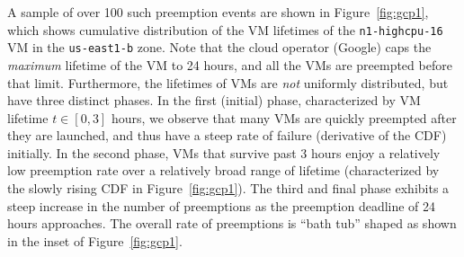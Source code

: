 A sample of over 100 such preemption events are shown in Figure~\ref{fig:gcp1}, which shows cumulative distribution of the VM lifetimes of the \texttt{n1-highcpu-16} VM in the \texttt{us-east1-b} zone. 
Note that the cloud operator (Google) caps the \emph{maximum} lifetime of the VM to 24 hours, and all the VMs are preempted before that limit. 
Furthermore, the lifetimes of VMs are \emph{not} uniformly distributed, but have three distinct phases. 
In the first (initial) phase, characterized by VM lifetime $t\in [0, 3]$ hours, we observe that many VMs are quickly preempted after they are launched, and thus have a steep rate of failure (derivative of the CDF) initially.
In the second phase, VMs that survive past 3 hours enjoy a relatively low preemption rate over a relatively broad range of lifetime (characterized by the slowly rising CDF in Figure~\ref{fig:gcp1}). The third and final phase exhibits a steep increase in the number of preemptions as the preemption deadline of 24 hours approaches. The overall rate of preemptions is ``bath tub'' shaped as shown in the inset of Figure~\ref{fig:gcp1}.


